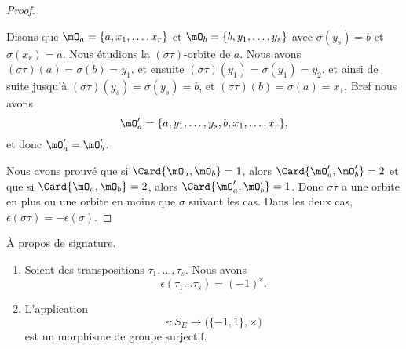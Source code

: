 \begin{proof}
\begin{subproof}
		\spitem[Si \( \mO_a\neq\mO_b\)]
		Disons que  \( \mO_a=\{ a,x_1,\ldots,x_r \}\) et \( \mO_b=\{ b,y_1,\ldots,y_s \}\) avec \( \sigma(y_s)=b\) et \( \sigma(x_r)=a\). Nous étudions la \( (\sigma\tau)\)-orbite de \( a\). Nous avons \( (\sigma\tau)(a)=\sigma(b)=y_1\), et ensuite \( (\sigma\tau)(y_1)=\sigma(y_1)=y_2\), et ainsi de suite jusqu'à \( (\sigma\tau)(y_s)=\sigma(y_s)=b\), et \( (\sigma\tau)(b)=\sigma(a)=x_1\). Bref nous avons
		\begin{equation}
			\mO_a'=\{ a,y_1,\ldots,y_s,b,x_1,\ldots,x_r \},
		\end{equation}
		et donc \( \mO_a'=\mO_b'\).
	\end{subproof}

	Nous avons prouvé que si \( \Card\{ \mO_a,\mO_b \}=1\), alors \( \Card\{ \mO_a',\mO_b' \}=2\) et que si \( \Card\{ \mO_a,\mO_b \}=2\), alors \( \Card\{ \mO_a',\mO_b' \}=1\). Donc \( \sigma\tau\) a une orbite en plus ou une orbite en moins que \( \sigma\) suivant les cas. Dans les deux cas, \( \epsilon(\sigma\tau)=-\epsilon(\sigma)\).
\end{proof}

\begin{theorem}	\label{THOooUILDooRUAZfW}
	À propos de signature.
	\begin{enumerate}
		\item		\label{ITEMooOLVOooWJKSDY}
		      Soient des transpositions \( \tau_1,\ldots,\tau_s\). Nous avons
		      \begin{equation}
			      \epsilon(\tau_1\ldots \tau_s)=(-1)^s.
		      \end{equation}
		\item		\label{ITEMooWRONooJQkhzG}
		      L'application
		      \begin{equation}
			      \epsilon \colon S_E\to \big( \{ -1,1 \},\times \big)
		      \end{equation}
		      est un morphisme de groupe surjectif.
	\end{enumerate}
\end{theorem}

